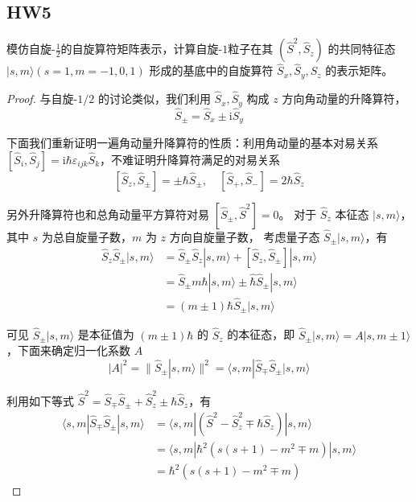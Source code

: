 \subsection{HW5}
\begin{1}
模仿自旋-$\frac12$的自旋算符矩阵表示，计算自旋-$1$粒子在其 $\left(\hat{S}^{2}, \hat{S}_{z}\right)$ 的共同特征态 $|s, m\rangle(s=1, m=-1,0,1)$ 形成的基底中的自旋算符 $\hat{S}_{x}, \hat{S}_{y}, \hat{S}_{z}$ 的表示矩阵。
\end{1}
\begin{proof}
    与自旋-$1/2$ 的讨论类似，我们利用 $\hat{S}_{x}, \hat{S}_{y}$ 构成 $z$ 方向角动量的升降算符，
$$\hat{S}_{\pm}=\hat{S}_{x} \pm \mathrm{i} \hat{S}_{y}$$

下面我们重新证明一遍角动量升降算符的性质：利用角动量的基本对易关系 $\left[\hat{S}_{i}, \hat{S}_{j}\right]=\mathrm{i} \hbar \varepsilon_{i j k} \hat{S}_{k}$，不难证明升降算符满足的对易关系
$$\left[\hat{S}_{z}, \hat{S}_{\pm}\right]
= \pm \hbar \hat{S}_{\pm}, \quad\left[\hat{S}_{+}, \hat{S}_{-}\right]
=2 \hbar \hat{S}_{z}$$

另外升降算符也和总角动量平方算符对易 $\left[\hat{S}_{\pm}, \hat{S}^{2}\right]=0$。
对于 $\hat{S}_{z}$ 本征态 $|s, m\rangle$，其中 $s$ 为总自旋量子数，$m$ 为 $z$ 方向自旋量子数，
考虑量子态 $\hat{S}_{\pm}|s, m\rangle$，有
$$\begin{aligned}
\hat{S}_{z} \hat{S}_{ \pm}|s, m\rangle & =\hat{S}_{ \pm} \hat{S}_{z}|s, m\rangle+\left[\hat{S}_{z}, \hat{S}_{ \pm}\right]|s, m\rangle \\
& =\hat{S}_{ \pm} m \hbar|s, m\rangle \pm \hat{\hbar} \hat{S}_{ \pm}|s, m\rangle \\
& =(m \pm 1) \hbar \hat{S}_{ \pm}|s, m\rangle
\end{aligned}$$

可见 $\hat{S}_{ \pm}|s, m\rangle$ 是本征值为 $(m \pm 1) \hbar$ 的 $\hat{S}_{z}$ 的本征态，即 $\hat{S}_{ \pm}|s, m\rangle=A|s, m \pm 1\rangle$，下面来确定归一化系数 $A$
$$|A|^{2}=\| \hat{S}_{ \pm}|s, m\rangle \|^{2}
=\langle s, m| \hat{S}_{\mp} \hat{S}_{ \pm}|s, m\rangle$$

利用如下等式 $\hat{S}^{2}=\hat{S}_{\mp} \hat{S}_{ \pm}+\hat{S}_{z}^{2} \pm \hbar \hat{S}_{z}$，有
$$\begin{aligned}
\langle s, m| \hat{S}_{\mp} \hat{S}_{ \pm}|s, m\rangle & =\langle s, m|\left(\hat{S}^{2}-\hat{S}_{z}^{2} \mp \hbar \hat{S}_{z}\right)|s, m\rangle \\
& =\langle s, m| \hbar^{2}\left(s(s+1)-m^{2} \mp m\right)|s, m\rangle \\
& =\hbar^{2}\left(s(s+1)-m^{2} \mp m\right)
\end{aligned}$$


\end{proof}

